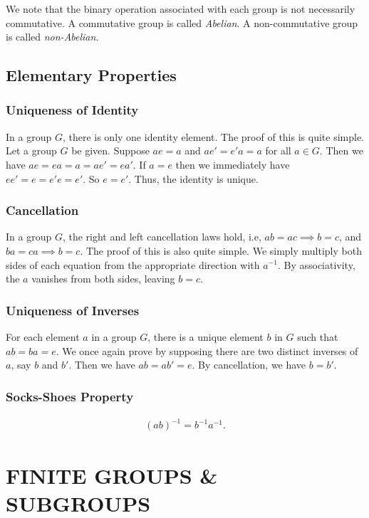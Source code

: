 \documentclass{book}
\theoremstyle{definition}
\begin{document}
We note that the binary operation associated with each group is not necessarily commutative. A commutative group is called \textit{Abelian}. A non-commutative group is called \textit{non-Abelian}. 



\section{Elementary Properties}

\subsection{Uniqueness of Identity}

In a group $G$, there is only one identity element. The proof of this is quite simple. Let a group $G$ be given. Suppose $ae = a$ and $ae' = e'a = a$ for all $a \in G$. Then we have $ae = ea = a = ae' = ea'$. If $a = e$ then we immediately have $ee' = e = e'e = e'$. So $e = e'$. Thus, the identity is unique.

\subsection{Cancellation}
In a group $G$, the right and left cancellation laws hold, i.e, $ab = ac \implies b = c$, and $ba = ca \implies b = c$. The proof of this is also quite simple. We simply multiply both sides of each equation from the appropriate direction with $a^{-1}$. By associativity, the $a$ vanishes from both sides, leaving $b=c$. 

\subsection{Uniqueness of Inverses}

For each element $a$ in a group $G$, there is a unique element $b$ in $G$ such that $ab  = ba = e$. We once again prove by supposing there are two distinct inverses of $a$, say $b$ and $b'$. Then we have $ab = ab' = e$. By cancellation, we have $b = b'$. 

\subsection{Socks-Shoes Property}

\begin{align}
(ab)^{-1} = b^{-1}a^{-1}.
\end{align}












\newpage





\chapter{FINITE GROUPS \& SUBGROUPS}
\end{document}
